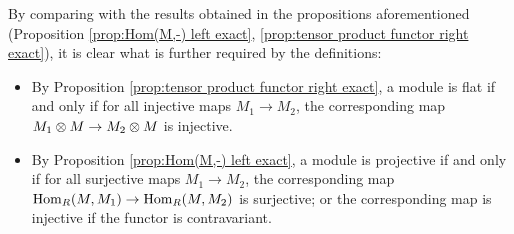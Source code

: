 \begin{remark}\label{rmk:diff def for projective module}
    By comparing with the results obtained in the propositions aforementioned (Proposition \ref{prop:Hom(M,-) left exact}, \ref{prop:tensor product functor right exact}), it is clear what is further required by the definitions:
    \begin{itemize}
        \item By Proposition \ref{prop:tensor product functor right exact}, a module is flat if and only if for all injective maps $M_1 \to M_2$, the corresponding map \\ $M_1 \otimes M \to M_2 \otimes M$ is injective.
        \item By Proposition \ref{prop:Hom(M,-) left exact}, a module is projective if and only if for all surjective maps $M_1 \to M_2$, the corresponding map \\ $\mathrm{Hom}_R(M, M_1) \to \mathrm{Hom}_R(M, M_2)$ is surjective; or the corresponding map is injective if the functor is contravariant.
    \end{itemize}
\end{remark}

